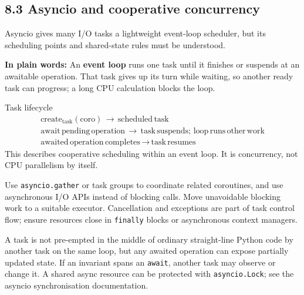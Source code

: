 \documentclass[11pt]{article}
\begin{document}
\begin{keepsection}
\section{8.3 Asyncio and cooperative concurrency}

Asyncio gives many I/O tasks a lightweight event-loop scheduler, but its scheduling points and shared-state rules must be understood.

\begin{plainbox}\textbf{In plain words:} An \textbf{event loop} runs one task until it finishes or suspends at an awaitable operation. That task gives up its turn while waiting, so another ready task can progress; a long CPU calculation blocks the loop.\end{plainbox}

\begin{equationcard}{Task lifecycle}
\[ \begin{gathered} \text{create}_\text{task}(\text{coro})\, \to \, \text{scheduled}\, \text{task} \\ \text{await}\, \text{pending}\, \text{operation}\, \to \, \text{task}\, \text{suspends};\, \text{loop}\, \text{runs}\, \text{other}\, \text{work} \\ \text{awaited}\, \text{operation}\, \text{completes}\, \to \, \text{task}\, \text{resumes} \end{gathered} \]
{\small This describes cooperative scheduling within an event loop. It is concurrency, not CPU parallelism by itself.}
\end{equationcard}

Use \texttt{asyncio.gather} or task groups to coordinate related coroutines, and use asynchronous I/O APIs instead of blocking calls. Move unavoidable blocking work to a suitable executor. Cancellation and exceptions are part of task control flow; ensure resources close in \texttt{finally} blocks or asynchronous context managers.

A task is not pre-empted in the middle of ordinary straight-line Python code by another task on the same loop, but any awaited operation can expose partially updated state. If an invariant spans an \texttt{await}, another task may observe or change it. A shared async resource can be protected with \texttt{asyncio.Lock}; see the asyncio synchronisation documentation.


\end{keepsection}
\end{document}
